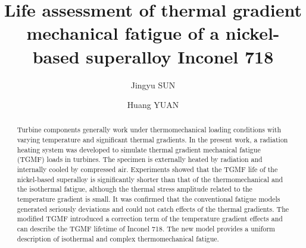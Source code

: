 \documentclass[preprint,5p,twocolumn,10pt,sort&compress]{elsarticle}
\begin{document}


\renewcommand\figureautorefname{Fig.}


\begin{frontmatter}



\title{Life assessment of thermal gradient mechanical fatigue of a nickel-based superalloy Inconel 718}


\author{Jingyu SUN}
\author{Huang YUAN}

\address{School of Aerospace Engineering, Tsinghua University, Beijing, China}

\begin{abstract}
Turbine components generally work under thermomechanical loading conditions with varying temperature and significant thermal gradients. In the present work, a radiation heating system was developed to simulate thermal gradient mechanical fatigue (TGMF) loads in turbines. The specimen is externally heated by radiation and internally cooled by compressed air. Experiments showed that the TGMF life of the nickel-based superalloy is significantly shorter than that of the thermomechanical and the isothermal fatigue, although the thermal stress amplitude related to the temperature gradient is small. It was confirmed that the conventional fatigue models generated seriously deviations and could not catch effects of the thermal gradients. The modified TGMF introduced a correction term of the temperature gradient effects and can describe the TGMF lifetime of Inconel 718. The new model provides a uniform description of isothermal and complex thermomechanical fatigue. 
\end{abstract}


\end{frontmatter}
\end{document}

